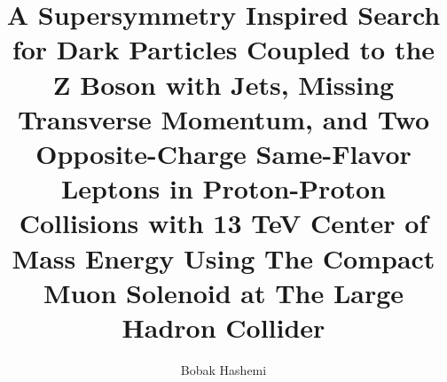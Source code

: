 %
%
%
%




\title{A Supersymmetry Inspired Search for Dark Particles Coupled to the Z Boson with Jets, Missing Transverse Momentum, and Two Opposite-Charge Same-Flavor Leptons in Proton-Proton Collisions with 13 TeV Center of Mass Energy Using The Compact Muon Solenoid at The Large Hadron Collider}

\author{Bobak Hashemi}
\degreeyear{\the\year}



%



